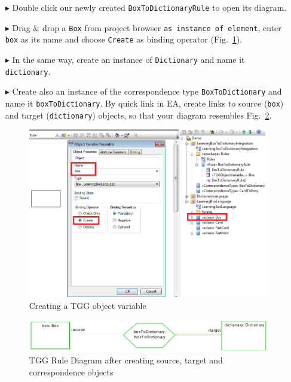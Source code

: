 \begin{enumerate}
\item[$\blacktriangleright$] Double click our newly created \texttt{BoxToDictionaryRule} to open its diagram.
\item[$\blacktriangleright$] Drag \& drop a \texttt{Box} from project browser \texttt{as instance of element}, enter \texttt{box} as its name and choose \texttt{Create} as binding operator (Fig.~\ref{fig:create_tgg_object}).

\item[$\blacktriangleright$] In the same way, create an instance of \texttt{Dictionary} and name it \texttt{dictionary}.

\item[$\blacktriangleright$] Create also an instance of the correspondence type \texttt{BoxToDictionary} and name it \texttt{boxToDictionary}.
By quick link in EA, create links to source (\texttt{box}) and target (\texttt{dictionary}) objects, so that your diagram resembles Fig.~\ref{fig:first_rule_diagram}.

\begin{figure}[htbp]
\begin{center}
  \includegraphics[width=\textwidth]{pics/tggBilder/tggRule/tgg10}
  \caption{Creating a TGG object variable}  
  \label{fig:create_tgg_object}
\end{center}
\end{figure}

\begin{figure}[htbp]
\begin{center}
  \includegraphics[width=\textwidth]{pics/tggBilder/tggRule/tgg11}
  \caption{TGG Rule Diagram after creating source, target and correspondence objects}  
  \label{fig:first_rule_diagram}
\end{center}
\end{figure}
\end{enumerate}

